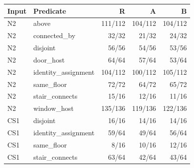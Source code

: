 \begin{tabular}{llrrr}
\toprule
Input & Predicate & R & A & B \\
\midrule
N2 & above & 111/112 & 104/112 & 104/112 \\
N2 & connected\_by & 32/32 & 21/32 & 24/32 \\
N2 & disjoint & 56/56 & 54/56 & 53/56 \\
N2 & door\_host & 64/64 & 57/64 & 53/64 \\
N2 & identity\_assignment & 104/112 & 100/112 & 105/112 \\
N2 & same\_floor & 72/72 & 64/72 & 65/72 \\
N2 & stair\_connects & 15/16 & 12/16 & 11/16 \\
N2 & window\_host & 135/136 & 119/136 & 122/136 \\
CS1 & disjoint & 16/16 & 14/16 & 14/16 \\
CS1 & identity\_assignment & 59/64 & 49/64 & 56/64 \\
CS1 & same\_floor & 8/16 & 10/16 & 12/16 \\
CS1 & stair\_connects & 63/64 & 42/64 & 43/64 \\
\bottomrule
\end{tabular}
